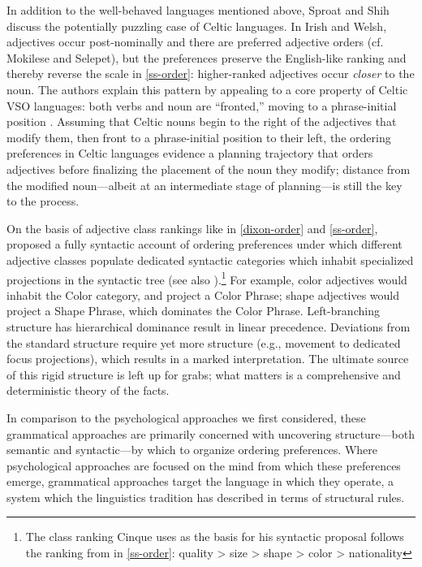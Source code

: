 \documentclass{pnastwo}
\begin{document}
\begin{article}
In addition to the well-behaved languages mentioned above, Sproat and Shih discuss the potentially puzzling case of Celtic languages. In Irish and Welsh, adjectives occur post-nominally and there are preferred adjective orders (cf. Mokilese and Selepet), but the preferences preserve the English-like ranking and thereby reverse the scale in \ref{ss-order}: higher-ranked adjectives occur  \emph{closer} to the noun. The authors explain this pattern by appealing to a core property of Celtic VSO languages: both verbs and noun are ``fronted,'' moving to a phrase-initial position \cite{sproat1985,guilfoyle1987}. Assuming that Celtic nouns begin to the right of the adjectives that modify them, then front to a phrase-initial position to their left, the ordering preferences in Celtic languages evidence a planning trajectory that orders adjectives before finalizing the placement of the noun they modify; distance from the modified noun---albeit at an intermediate stage of planning---is still the key to the process.

On the basis of adjective class rankings like in \ref{dixon-order} and \ref{ss-order}, \cite{cinque1994} proposed a fully syntactic account of ordering preferences under which different adjective classes populate dedicated syntactic categories which inhabit specialized projections in the syntactic tree (see also \cite{scott2002}).\footnote{The class ranking Cinque uses as the basis for his syntactic proposal follows the ranking from \cite{sproatshih1991} in \ref{ss-order}: 
	\be quality > size > shape > color > nationality\label{cinque-order}\ee}
For example, color adjectives would inhabit the Color category, and project a Color Phrase; shape adjectives would project a Shape Phrase, which dominates the Color Phrase. Left-branching structure has hierarchical dominance result in linear precedence. Deviations from the standard structure require yet more structure (e.g., movement to dedicated focus projections), which results in a marked interpretation. The ultimate source of this rigid structure is left up for grabs; what matters is a comprehensive and deterministic theory of the facts.

In comparison to the psychological approaches we first considered, these grammatical approaches are primarily concerned with uncovering structure---both semantic and syntactic---by which to organize ordering preferences. Where psychological approaches are focused on the mind from which these preferences emerge, grammatical approaches target the language in which they operate, a system which the linguistics tradition has described in terms of structural rules.


\end{article}
\end{document}

